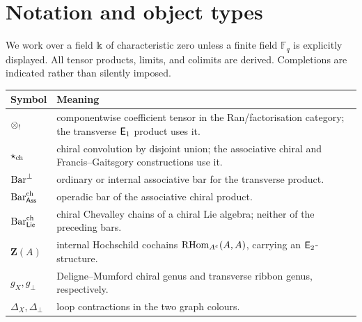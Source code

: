 \chapter*{Notation and object types}
We work over a field \(\Bbbk\) of characteristic zero unless a finite field \(\mathbb F_q\) is explicitly displayed.  All tensor products, limits, and colimits are derived.  Completions are indicated rather than silently imposed.

\begin{center}
\begin{tabularx}{0.96\textwidth}{>{\bfseries}p{}X}
\toprule
Symbol & Meaning\\
\midrule
\(\mathbin{\otimes_{!}}\) & componentwise coefficient tensor in the Ran/factorisation category; the transverse \(\mathsf E_1\) product uses it.\\
\(\mathbin{\star_{\mathrm{ch}}}\) & chiral convolution by disjoint union; the associative chiral and Francis--Gaitsgory constructions use it.\\
\(\operatorname{Bar}^{\perp}\) & ordinary or internal associative bar for the transverse product.\\
\(\operatorname{Bar}^{\mathrm{ch}}_{\mathsf{Ass}}\) & operadic bar of the associative chiral product.\\
\(\operatorname{Bar}^{\mathrm{ch}}_{\mathsf{Lie}}\) & chiral Chevalley chains of a chiral Lie algebra; neither of the preceding bars.\\
\(\mathbf Z(A)\) & internal Hochschild cochains \(\operatorname{RHom}_{A^e}(A,A)\), carrying an \(\mathsf E_2\)-structure.\\
\(g_X,g_\perp\) & Deligne--Mumford chiral genus and transverse ribbon genus, respectively.\\
\(\Delta_X,\Delta_\perp\) & loop contractions in the two graph colours.\\
\bottomrule
\end{tabularx}
\end{center}
